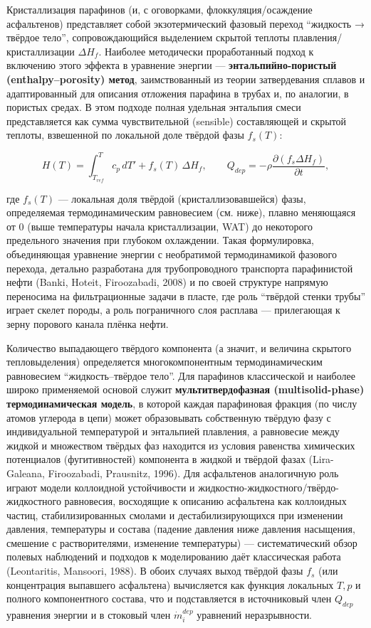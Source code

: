 \documentclass[11pt]{extarticle}
\begin{document}
Кристаллизация парафинов (и, с оговорками, флоккуляция/осаждение асфальтенов) представляет собой экзотермический фазовый переход ``жидкость → твёрдое тело'', сопровождающийся выделением скрытой теплоты плавления/кристаллизации \(\Delta H_f\). Наиболее методически проработанный подход к включению этого эффекта в уравнение энергии --- \textbf{энтальпийно-пористый (enthalpy--porosity) метод}, заимствованный из теории затвердевания сплавов и адаптированный для описания отложения парафина в трубах и, по аналогии, в пористых средах. В этом подходе полная удельная энтальпия смеси представляется как сумма чувствительной (sensible) составляющей и скрытой теплоты, взвешенной по локальной доле твёрдой фазы \(f_s(T)\):

\[
H(T) = \int_{T_{ref}}^{T} c_p\, dT' + f_s(T)\,\Delta H_f, \qquad
Q_{dep} = -\rho \frac{\partial (f_s \Delta H_f)}{\partial t},
\]

где \(f_s(T)\) --- локальная доля твёрдой (кристаллизовавшейся) фазы, определяемая термодинамическим равновесием (см. ниже), плавно меняющаяся от 0 (выше температуры начала кристаллизации, WAT) до некоторого предельного значения при глубоком охлаждении. Такая формулировка, объединяющая уравнение энергии с необратимой термодинамикой фазового перехода, детально разработана для трубопроводного транспорта парафинистой нефти (Banki, Hoteit, Firoozabadi, 2008) и по своей структуре напрямую переносима на фильтрационные задачи в пласте, где роль ``твёрдой стенки трубы'' играет скелет породы, а роль пограничного слоя расплава --- прилегающая к зерну порового канала плёнка нефти.

Количество выпадающего твёрдого компонента (а значит, и величина скрытого тепловыделения) определяется многокомпонентным термодинамическим равновесием ``жидкость--твёрдое тело''. Для парафинов классической и наиболее широко применяемой основой служит \textbf{мультитвердофазная (multisolid-phase) термодинамическая модель}, в которой каждая парафиновая фракция (по числу атомов углерода в цепи) может образовывать собственную твёрдую фазу с индивидуальной температурой и энтальпией плавления, а равновесие между жидкой и множеством твёрдых фаз находится из условия равенства химических потенциалов (фугитивностей) компонента в жидкой и твёрдой фазах (Lira-Galeana, Firoozabadi, Prausnitz, 1996). Для асфальтенов аналогичную роль играют модели коллоидной устойчивости и жидкостно-жидкостного/твёрдо-жидкостного равновесия, восходящие к описанию асфальтена как коллоидных частиц, стабилизированных смолами и дестабилизирующихся при изменении давления, температуры и состава (падение давления ниже давления насыщения, смешение с растворителями, изменение температуры) --- систематический обзор полевых наблюдений и подходов к моделированию даёт классическая работа (Leontaritis, Mansoori, 1988). В обоих случаях выход твёрдой фазы \(f_s\) (или концентрация выпавшего асфальтена) вычисляется как функция локальных \(T, p\) и полного компонентного состава, что и подставляется в источниковый член \(Q_{dep}\) уравнения энергии и в стоковый член \(\dot m_i^{dep}\) уравнений неразрывности.
\end{document}
